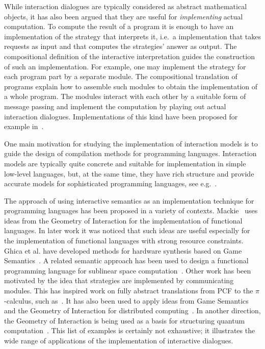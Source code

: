 \documentclass{LMCS}
\theoremstyle{definition}
\theoremstyle{plain}
\begin{document}
While interaction dialogues are typically considered as abstract mathematical
objects, it has also been argued that they are useful for \emph{implementing}
actual computation.  To compute the result of a program it is enough to have an
implementation of the strategy that interprets it, i.e.~a implementation that takes
requests as input and that computes the strategies' answer as output.  The
compositional definition of the interactive interpretation guides the
construction of such an implementation.  For example, one may implement the
strategy for each program part by a separate module.  The compositional
translation of programs explain how to assemble such modules to obtain the
implementation of a whole program.  The modules interact with each other by a suitable
form of message passing and implement the computation by playing out actual
interaction dialogues.
Implementations of this kind have been proposed 
for example in~\cite{DBLP:conf/tgc/FredrikssonG12,DBLP:conf/lics/FredrikssonG13,intml}.

One main motivation for studying the implementation of interaction models is 
to guide the design of compilation methods for programming languages. Interaction models are typically quite
concrete and suitable for implementation in simple low-level languages,
but, at the same time, they have rich structure and provide accurate models for
sophisticated programming languages, see e.g.~\cite{AbramskyJM00,HylandOng,DBLP:journals/apal/MurawskiT13}. 

The approach of using interactive semantics as an implementation technique for
programming languages has been  proposed in a variety of contexts. 
Mackie~\cite{DBLP:conf/popl/Mackie95} uses ideas from
the Geometry of Interaction for the implementation of functional
languages.
In later work it was noticed that such ideas are useful especially for
the implementation of functional languages with strong resource constraints.
Ghica et al. have developed methods for hardware synthesis
based on Game Semantics~\cite{Ghica07,DBLP:conf/icfp/GhicaSS11}. A 
related semantic approach has been
used to design a functional programming language for sublinear
space computation~\cite{intml}.
Other work has been motivated by the idea that strategies are implemented 
by communicating modules. 
This has inspired work on fully abstract translations from PCF
to the $\pi$-calculus, such as~\cite{DBLP:conf/fpca/HylandO95,BergerHY01}.
It has also been used to apply ideas from Game Semantics and the Geometry
of Interaction for distributed computing~\cite{DBLP:conf/tgc/FredrikssonG12}.
In another direction, the Geometry of Interaction is being used 
as a basis for structuring quantum computation~\cite{DBLP:conf/lics/HasuoH11,DBLP:conf/esop/YoshimizuHFL14}.
This list of examples is certainly not exhaustive; it illustrates the 
wide range of applications of the implementation of interactive dialogues.
\end{document}
